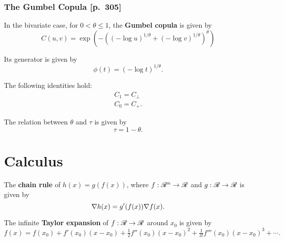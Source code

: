 \subsubsection{The Gumbel Copula [p.~305]}
\begin{outline}
  \1 In the bivariate case, for $0<\theta\leq1$, the \textbf{Gumbel copula} is given by
  \begin{equation*}
    C(u,v) = \exp(-((-\log u)^{1/\theta} + (-\log v)^{1/\theta})^\theta)
  \end{equation*}

  \1 Its generator is given by
  \begin{equation*}
    \phi(t) = (-\log t)^{1/\theta}.
  \end{equation*}

  \1 The following identities hold:
  \begin{gather*}
    C_1 = C_\perp\\
    C_0 = C_{+}.
  \end{gather*}

  \1 The relation between $\theta$ and $\tau$ is given by
  \begin{equation*}
    \tau = 1-\theta.
  \end{equation*}
\end{outline}


\section{Calculus}
\begin{outline}
  \1 The \textbf{chain rule} of $h(x) = g(f(x))$, where $f:\mathscr{R}^n\to\mathscr{R}$ and
  $g:\mathscr{R}\to\mathscr{R}$ is given by
  \begin{equation*}
    \nabla h(x) = g'(f(x))\nabla f(x).  
  \end{equation*}

  \1 The infinite \textbf{Taylor expansion} of $f:\mathscr{R}\to\mathscr{R}$ around $x_0$ is given by
  \begin{equation*}
    f(x) = f(x_0) + f'(x_0)(x-x_0) + \tfrac{1}{2} f''(x_0)(x-x_0)^2 +
    \tfrac{1}{3!}f'''(x_0)(x-x_0)^3 + \cdots.
  \end{equation*}
\end{outline}


